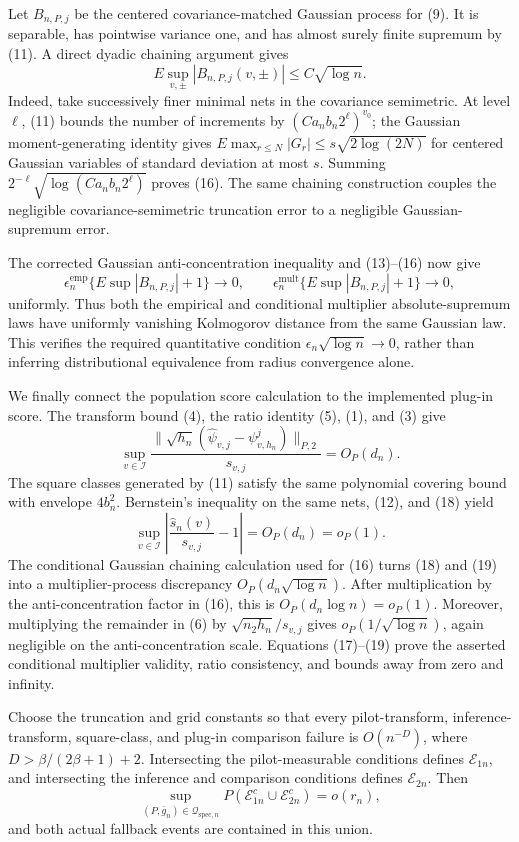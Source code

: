 Let \(B_{n,P,j}\) be the centered covariance-matched Gaussian process for (9).  It is separable, has pointwise variance one, and has almost surely finite supremum by (11).  A direct dyadic chaining argument gives
\[
 E\sup_{v,\pm}|B_{n,P,j}(v,\pm)|\le C\sqrt{\log n}. \tag{16}
\]
Indeed, take successively finer minimal nets in the covariance semimetric.  At level \(\ell\), (11) bounds the number of increments by \((Ca_nb_n2^\ell)^{v_0}\); the Gaussian moment-generating identity gives
\(E\max_{r\le N}|G_r|\le s\sqrt{2\log(2N)}\) for centered Gaussian variables of standard deviation at most \(s\).  Summing
\(2^{-\ell}\sqrt{\log(Ca_nb_n2^\ell)}\) proves (16).  The same chaining construction couples the negligible covariance-semimetric truncation error to a negligible Gaussian-supremum error.

The corrected Gaussian anti-concentration inequality and (13)--(16) now give
\[
 \epsilon_n^{\mathrm{emp}}\{E\sup|B_{n,P,j}|+1\}\to0,
 \qquad
 \epsilon_n^{\mathrm{mult}}\{E\sup|B_{n,P,j}|+1\}\to0, \tag{17}
\]
uniformly.  Thus both the empirical and conditional multiplier absolute-supremum laws have uniformly vanishing Kolmogorov distance from the same Gaussian law.  This verifies the required quantitative condition \(\epsilon_n\sqrt{\log n}\to0\), rather than inferring distributional equivalence from radius convergence alone.

We finally connect the population score calculation to the implemented plug-in score.  The transform bound (4), the ratio identity (5), (1), and (3) give
\[
 \sup_{v\in\mathcal I}
 \frac{\|\sqrt{h_n}(\widehat\psi_{v,j}-\psi^j_{v,h_n})\|_{P,2}}{s_{v,j}}
 =O_P(d_n). \tag{18}
\]
The square classes generated by (11) satisfy the same polynomial covering bound with envelope \(4b_n^2\).  Bernstein's inequality on the same nets, (12), and (18) yield
\[
 \sup_{v\in\mathcal I}\left|\frac{\widehat s_n(v)}{s_{v,j}}-1\right|=O_P(d_n)=o_P(1). \tag{19}
\]
The conditional Gaussian chaining calculation used for (16) turns (18) and (19) into a multiplier-process discrepancy \(O_P(d_n\sqrt{\log n})\).  After multiplication by the anti-concentration factor in (16), this is \(O_P(d_n\log n)=o_P(1)\).  Moreover, multiplying the remainder in (6) by \(\sqrt{n_2h_n}/s_{v,j}\) gives \(o_P(1/\sqrt{\log n})\), again negligible on the anti-concentration scale.  Equations (17)--(19) prove the asserted conditional multiplier validity, ratio consistency, and bounds away from zero and infinity.

Choose the truncation and grid constants so that every pilot-transform, inference-transform, square-class, and plug-in comparison failure is \(O(n^{-D})\), where \(D>\beta/(2\beta+1)+2\).  Intersecting the pilot-measurable conditions defines \(\mathcal E_{1n}\), and intersecting the inference and comparison conditions defines \(\mathcal E_{2n}\).  Then
\[
 \sup_{(P,\bar g_n)\in\mathcal Q_{\mathrm{spec},n}}
 P(\mathcal E_{1n}^c\cup\mathcal E_{2n}^c)=o(r_n), \tag{20}
\]
and both actual fallback events are contained in this union.

